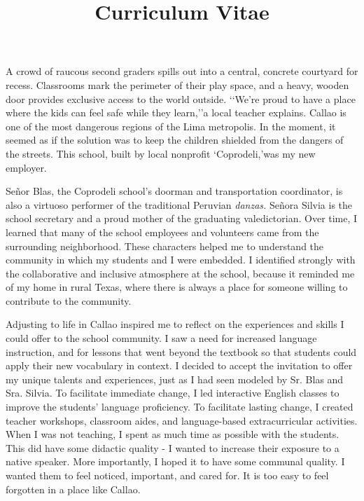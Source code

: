 \documentclass[12pt,a4paper,roman]{moderncv} %
\title{Curriculum Vitae}
\begin{document}


\clearpage


A crowd of raucous second graders spills out into a central, concrete courtyard for recess. Classrooms mark the perimeter of their play space, and a heavy, wooden door provides exclusive access to the world outside. \lq\lq We're proud to have a place where the kids can feel safe while they learn,\rq\rq\space a local teacher explains. Callao is one of the most dangerous regions of the Lima metropolis. In the moment, it seemed as if the solution was to keep the children shielded from the dangers of the streets. This school, built by local nonprofit  \lq Coprodeli,\rq\space was my new employer.

\medskip
 
 Se\~nor Blas, the Coprodeli school's doorman and transportation coordinator, is also a virtuoso performer of the traditional Peruvian \textit{danzas.} Se\~nora Silvia is the school secretary and a proud mother of the graduating valedictorian.  Over time, I learned that many of the school employees and volunteers came from the surrounding neighborhood. These characters helped me to understand the community in which my students and I were embedded. I identified strongly with the collaborative and inclusive atmosphere at the school, because it reminded me of my home in rural Texas, where there is always a place for someone willing to contribute to the community.

\medskip

Adjusting to life in Callao inspired me to reflect on the experiences and skills I could offer to the school community. I saw a need for increased language instruction, and for lessons that went beyond the textbook so that students could apply their new vocabulary in context. I decided to accept the invitation to offer my unique talents and experiences, just as I had seen modeled by Sr. Blas and Sra. Silvia. To facilitate immediate change, I led interactive English classes to improve the students' language proficiency. To facilitate lasting change, I created teacher workshops, classroom aides, and language-based extracurricular activities.  When I was not teaching, I spent as much time as possible with the students. This did have some didactic quality - I wanted to increase their exposure to a native speaker. More importantly, I hoped it to have some communal quality. I wanted them to feel noticed, important, and cared for. It is too easy to feel forgotten in a place like Callao.
\end{document}
